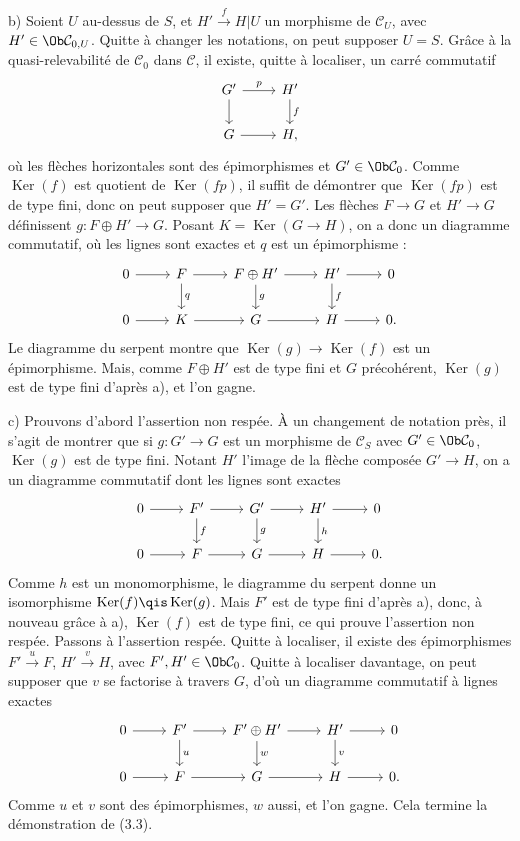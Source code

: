 \documentclass[11pt]{article}
\providecommand{\Ker}{\operatorname{Ker}}
\begin{document}
b) Soient \(U\) au-dessus de \(S\), et \(H'\xrightarrow{f}H|U\) un morphisme de \(\mathcal C_U\), avec \(H'\in\Ob\mathcal C_{0,U}\). Quitte à changer les notations, on peut supposer \(U=S\). Grâce à la quasi-relevabilité de \(\mathcal C_0\) dans \(\mathcal C\), il existe, quitte à localiser, un carré commutatif
\[
\begin{tikzcd}
G' \arrow[r,"p"] \arrow[d] & H' \arrow[d,"f"]\\
G \arrow[r] & H,
\end{tikzcd}
\]
où les flèches horizontales sont des épimorphismes et \(G'\in\Ob\mathcal C_0\). Comme \(\Ker(f)\) est quotient de \(\Ker(fp)\), il suffit de démontrer que \(\Ker(fp)\) est de type fini, donc on peut supposer que \(H'=G'\). Les flèches \(F\to G\) et \(H'\to G\) définissent \(g:F\oplus H'\to G\). Posant \(K=\Ker(G\to H)\), on a donc un diagramme commutatif, où les lignes sont exactes et \(q\) est un épimorphisme :
\[
\begin{tikzcd}
0\arrow[r]&F\arrow[r]\arrow[d,"q"]&F\oplus H'\arrow[r]\arrow[d,"g"]&H'\arrow[r]\arrow[d,"f"]&0\\
0\arrow[r]&K\arrow[r]&G\arrow[r]&H\arrow[r]&0 .
\end{tikzcd}
\]
Le diagramme du serpent montre que \(\Ker(g)\to\Ker(f)\) est un épimorphisme. Mais, comme \(F\oplus H'\) est de type fini et \(G\) précohérent, \(\Ker(g)\) est de type fini d'après a), et l'on gagne.

c) Prouvons d'abord l'assertion non respée. À un changement de notation près, il s'agit de montrer que si \(g:G'\to G\) est un morphisme de \(\mathcal C_S\) avec \(G'\in\Ob\mathcal C_0\), \(\Ker(g)\) est de type fini. Notant \(H'\) l'image de la flèche composée \(G'\to H\), on a un diagramme commutatif dont les lignes sont exactes
\[
\begin{tikzcd}
0\arrow[r]&F'\arrow[r]\arrow[d,"f"]&G'\arrow[r]\arrow[d,"g"]&H'\arrow[r]\arrow[d,"h"]&0\\
0\arrow[r]&F\arrow[r]&G\arrow[r]&H\arrow[r]&0 .
\end{tikzcd}
\]
Comme \(h\) est un monomorphisme, le diagramme du serpent donne un isomorphisme \(\Ker(f)\qis\Ker(g)\). Mais \(F'\) est de type fini d'après a), donc, à nouveau grâce à a), \(\Ker(f)\) est de type fini, ce qui prouve l'assertion non respée. Passons à l'assertion respée. Quitte à localiser, il existe des épimorphismes \(F'\xrightarrow{u}F\), \(H'\xrightarrow{v}H\), avec \(F',H'\in\Ob\mathcal C_0\). Quitte à localiser davantage, on peut supposer que \(v\) se factorise à travers \(G\), d'où un diagramme commutatif à lignes exactes
\[
\begin{tikzcd}
0\arrow[r]&F'\arrow[r]\arrow[d,"u"]&F'\oplus H'\arrow[r]\arrow[d,"w"]&H'\arrow[r]\arrow[d,"v"]&0\\
0\arrow[r]&F\arrow[r]&G\arrow[r]&H\arrow[r]&0 .
\end{tikzcd}
\]
Comme \(u\) et \(v\) sont des épimorphismes, \(w\) aussi, et l'on gagne. Cela termine la démonstration de (3.3).
\end{document}
